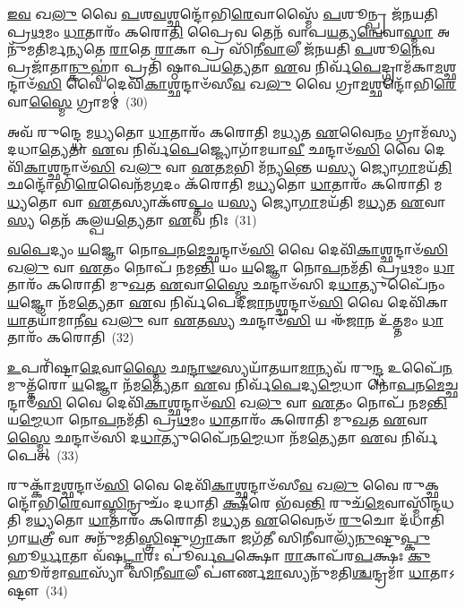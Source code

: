 \-\ul{𑌇}\-\-\ul{𑌵} 𑌖\-\ul{𑌲𑍁} 𑌵𑍈 \ul{𑌪}\-𑌶\-\ul{𑌵}\-𑌶𑍍𑌛𑌨𑍍𑌦𑍋᳴𑌭𑌿\-\ul{𑌰𑍇}\-𑌵𑌾𑌸𑍍𑌮𑍈᳴ \ul{𑌪}\-𑌶𑍂𑌨𑍍𑌪𑍍𑌰 𑌜᳴𑌨𑌯𑌤𑌿 𑌪𑍍𑌰\-\ul{𑌥}\-𑌮𑌂 \ul{𑌧𑌾}\-𑌤𑌾𑌰𑌂᳴ 𑌕𑌰𑍋\-\ul{𑌤𑌿} 𑌪𑍍𑌰𑍈𑌵 𑌤𑍇𑌨᳴ 𑌵𑌾𑌪\-\ul{𑌯}\-𑌤𑍍𑌯\-\ul{𑌨𑍍𑌵𑍇}\-𑌵𑌾\-\ul{𑌸𑍍𑌮𑌾} 𑌅𑌨𑍁᳴𑌮𑌤𑌿𑌰𑍍𑌮𑌨𑍍𑌯𑌤𑍇 \ul{𑌰𑌾}\-𑌤𑍇 \ul{𑌰𑌾}\-𑌕𑌾 𑌪𑍍𑌰 𑌸𑌿᳴𑌨𑍀\-\ul{𑌵𑌾}\-𑌲𑍀 𑌜᳴𑌨𑌯𑌤𑌿 \ul{𑌪}\-𑌶𑍂\-\ul{𑌨𑍇}\-𑌵 𑌪𑍍𑌰𑌜𑌾᳴𑌤𑌾\-\ul{𑌨𑍍𑌕𑍁}\-𑌹𑍍𑌵𑌾॑ 𑌪𑍍𑌰𑌤𑌿᳴ 𑌷𑍍𑌠𑌾𑌪𑌯\-\ul{𑌤𑍍𑌯𑍇}\-𑌤𑌾 \ul{𑌏}\-𑌵 𑌨𑌿𑌰𑍍𑌵᳴\-\ul{𑌪𑍇}\-𑌦𑍍𑌗𑍍𑌰𑌾𑌮᳴𑌕𑌾\-\ul{𑌮}\-𑌶𑍍𑌛𑌨𑍍𑌦𑌾𑍞᳴\-\ul{𑌸𑌿} 𑌵𑍈 𑌦𑍇𑌵𑌿᳴\-\ul{𑌕𑌾}\-𑌶𑍍𑌛𑌨𑍍𑌦𑌾𑍞᳴𑌸𑍀\-\ul{𑌵} 𑌖\-\ul{𑌲𑍁} 𑌵𑍈 𑌗𑍍𑌰𑌾\-\ul{𑌮}\-𑌶𑍍𑌛𑌨𑍍𑌦𑍋᳴𑌭𑌿\-\ul{𑌰𑍇}\-𑌵𑌾\-\ul{𑌸𑍍𑌮𑍈} 𑌗𑍍𑌰𑌾𑌮𑌮𑍍॑~(30)

𑌅𑌵᳴ 𑌰𑍁𑌨𑍍𑌦𑍍𑌧𑍇 𑌮\-\ul{𑌧𑍍𑌯}\-𑌤𑍋 \ul{𑌧𑌾}\-𑌤𑌾𑌰𑌂᳴ 𑌕𑌰𑍋𑌤𑌿 𑌮\-\ul{𑌧𑍍𑌯}\-𑌤 \ul{𑌏}\-𑌵𑍈\-\ul{𑌨𑌂} 𑌗𑍍𑌰𑌾𑌮᳴𑌸𑍍𑌯 𑌦𑌧𑌾\-\ul{𑌤𑍍𑌯𑍇}\-𑌤𑌾 \ul{𑌏}\-𑌵 𑌨𑌿𑌰𑍍𑌵᳴\-\ul{𑌪𑍇}\-𑌜𑍍𑌜𑍍𑌯𑍋𑌗𑌾᳴𑌮𑌯𑌾\-\ul{𑌵𑍀} 𑌛𑌨𑍍𑌦𑌾𑍞᳴\-\ul{𑌸𑌿} 𑌵𑍈 𑌦𑍇𑌵𑌿᳴\-\ul{𑌕𑌾}\-𑌶𑍍𑌛𑌨𑍍𑌦𑌾𑍞᳴\-\ul{𑌸𑌿} 𑌖\-\ul{𑌲𑍁} 𑌵𑌾 \ul{𑌏}\-𑌤\-\ul{𑌮}\-𑌭𑌿 𑌮᳴𑌨𑍍𑌯\-\ul{𑌨𑍍𑌤𑍇} 𑌯\-\ul{𑌸𑍍𑌯} 𑌜𑍍𑌯𑍋\-\ul{𑌗𑌾}\-𑌮𑌯᳴\-\ul{𑌤𑌿} 𑌛𑌨𑍍𑌦𑍋᳴𑌭𑌿\-\ul{𑌰𑍇}\-𑌵𑍈𑌨᳴𑌮\-\ul{𑌗}\-𑌦𑌂 𑌕᳴𑌰𑍋𑌤𑌿 𑌮\-\ul{𑌧𑍍𑌯}\-𑌤𑍋 \ul{𑌧𑌾}\-𑌤𑌾𑌰𑌂᳴ 𑌕𑌰𑍋𑌤𑌿 𑌮\-\ul{𑌧𑍍𑌯}\-𑌤𑍋 𑌵𑌾 \ul{𑌏}\-𑌤𑌸𑍍𑌯𑌾𑌕𑍢᳴\-\ul{𑌪𑍍𑌤𑌂} 𑌯\-\ul{𑌸𑍍𑌯} 𑌜𑍍𑌯𑍋\-\ul{𑌗𑌾}\-𑌮𑌯᳴𑌤𑌿 𑌮\-\ul{𑌧𑍍𑌯}\-𑌤 \ul{𑌏}\-𑌵𑌾\-\ul{𑌸𑍍𑌯} 𑌤𑍇𑌨᳴ 𑌕𑌲𑍍𑌪𑌯\-\ul{𑌤𑍍𑌯𑍇}\-𑌤𑌾 \ul{𑌏}\-𑌵 𑌨𑌿𑌃~(31)

\-\ul{𑌵}\-\-\ul{𑌪𑍇}\-𑌦𑍍𑌯𑌂 \ul{𑌯}\-𑌜𑍍𑌞𑍋 𑌨𑍋\-\ul{𑌪}\-𑌨\-\ul{𑌮𑍇}\-𑌚𑍍𑌛𑌨𑍍𑌦𑌾𑍞᳴\-\ul{𑌸𑌿} 𑌵𑍈 𑌦𑍇𑌵𑌿᳴\-\ul{𑌕𑌾}\-𑌶𑍍𑌛𑌨𑍍𑌦𑌾𑍞᳴\-\ul{𑌸𑌿} 𑌖\-\ul{𑌲𑍁} 𑌵𑌾 \ul{𑌏}\-𑌤𑌂 𑌨𑍋𑌪᳴ 𑌨𑌮\-\ul{𑌨𑍍𑌤𑌿} 𑌯𑌂 \ul{𑌯}\-𑌜𑍍𑌞𑍋 𑌨𑍋\-\ul{𑌪}\-𑌨𑌮᳴𑌤𑌿 𑌪𑍍𑌰\-\ul{𑌥}\-𑌮𑌂 \ul{𑌧𑌾}\-𑌤𑌾𑌰𑌂᳴ 𑌕𑌰𑍋𑌤𑌿 𑌮𑍁\-\ul{𑌖}\-𑌤 \ul{𑌏}\-𑌵𑌾\-\ul{𑌸𑍍𑌮𑍈} 𑌛𑌨𑍍𑌦𑌾𑍞᳴𑌸𑌿 𑌦\-\ul{𑌧𑌾}\-𑌤𑍍𑌯𑍁𑌪𑍈᳴𑌨𑌂 \ul{𑌯}\-𑌜𑍍𑌞𑍋 𑌨᳴𑌮\-\ul{𑌤𑍍𑌯𑍇}\-𑌤𑌾 \ul{𑌏}\-𑌵 𑌨𑌿𑌰𑍍𑌵᳴𑌪𑍇𑌦𑍀\-\ul{𑌜𑌾}\-𑌨𑌶𑍍𑌛𑌨𑍍𑌦𑌾𑍞᳴\-\ul{𑌸𑌿} 𑌵𑍈 𑌦𑍇𑌵𑌿᳴𑌕𑌾 \ul{𑌯𑌾}\-𑌤𑌯𑌾᳴𑌮𑌾𑌨𑍀\-\ul{𑌵} 𑌖\-\ul{𑌲𑍁} 𑌵𑌾 \ul{𑌏}\-𑌤\-\ul{𑌸𑍍𑌯} 𑌛𑌨𑍍𑌦𑌾𑍞᳴\-\ul{𑌸𑌿} 𑌯 𑌈᳴\-\ul{𑌜𑌾}\-𑌨 𑌉᳴\-\ul{𑌤𑍍𑌤}\-𑌮𑌂 \ul{𑌧𑌾}\-𑌤𑌾𑌰𑌂᳴ 𑌕𑌰𑍋𑌤𑌿~(32)

\-\ul{𑌉}\-𑌪𑌰𑌿᳴𑌷𑍍𑌟𑌾\-\ul{𑌦𑍇}\-𑌵𑌾\-\ul{𑌸𑍍𑌮𑍈} 𑌛\-\ul{𑌨𑍍𑌦𑌾}\-\-\ul{𑍟}\-𑌸𑍍𑌯𑌯𑌾᳴𑌤𑌯𑌾\-\ul{𑌮𑌾}\-𑌨𑍍𑌯𑌵᳴ 𑌰𑍁\-\ul{𑌨𑍍𑌦𑍍𑌧} 𑌉𑌪𑍈᳴\-\ul{𑌨}\-𑌮𑍁𑌤𑍍𑌤᳴𑌰𑍋 \ul{𑌯}\-𑌜𑍍𑌞𑍋 𑌨᳴𑌮\-\ul{𑌤𑍍𑌯𑍇}\-𑌤𑌾 \ul{𑌏}\-𑌵 𑌨𑌿𑌰𑍍𑌵᳴\-\ul{𑌪𑍇}\-𑌦𑍍𑌯\-\ul{𑌮𑍍𑌮𑍇}\-𑌧𑌾 𑌨𑍋\-\ul{𑌪}\-𑌨\-\ul{𑌮𑍇}\-𑌚𑍍𑌛𑌨𑍍𑌦𑌾𑍞᳴\-\ul{𑌸𑌿} 𑌵𑍈 𑌦𑍇𑌵𑌿᳴\-\ul{𑌕𑌾}\-𑌶𑍍𑌛𑌨𑍍𑌦𑌾𑍞᳴\-\ul{𑌸𑌿} 𑌖\-\ul{𑌲𑍁} 𑌵𑌾 \ul{𑌏}\-𑌤𑌂 𑌨𑍋𑌪᳴ 𑌨𑌮\-\ul{𑌨𑍍𑌤𑌿} 𑌯\-\ul{𑌮𑍍𑌮𑍇}\-𑌧𑌾 𑌨𑍋\-\ul{𑌪}\-𑌨𑌮᳴𑌤𑌿 𑌪𑍍𑌰\-\ul{𑌥}\-𑌮𑌂 \ul{𑌧𑌾}\-𑌤𑌾𑌰𑌂᳴ 𑌕𑌰𑍋𑌤𑌿 𑌮𑍁\-\ul{𑌖}\-𑌤 \ul{𑌏}\-𑌵𑌾\-\ul{𑌸𑍍𑌮𑍈} 𑌛𑌨𑍍𑌦𑌾𑍞᳴𑌸𑌿 𑌦\-\ul{𑌧𑌾}\-𑌤𑍍𑌯𑍁𑌪𑍈᳴𑌨\-\ul{𑌮𑍍𑌮𑍇}\-𑌧𑌾 𑌨᳴𑌮\-\ul{𑌤𑍍𑌯𑍇}\-𑌤𑌾 \ul{𑌏}\-𑌵 𑌨𑌿𑌰𑍍𑌵᳴𑌪𑍇𑌤𑍍~(33)

𑌰𑍁𑌕𑍍𑌕𑌾᳴\-\ul{𑌮}\-𑌶𑍍𑌛𑌨𑍍𑌦𑌾𑍞᳴\-\ul{𑌸𑌿} 𑌵𑍈 𑌦𑍇𑌵𑌿᳴\-\ul{𑌕𑌾}\-𑌶𑍍𑌛𑌨𑍍𑌦𑌾𑍞᳴𑌸𑍀\-\ul{𑌵} 𑌖\-\ul{𑌲𑍁} 𑌵𑍈 𑌰𑍁𑌕𑍍𑌛𑌨𑍍𑌦𑍋᳴𑌭𑌿\-\ul{𑌰𑍇}\-𑌵𑌾\-\ul{𑌸𑍍𑌮𑌿}\-𑌨𑍍𑌰𑍁𑌚𑌂᳴ 𑌦𑌧𑌾𑌤𑌿 \ul{𑌕𑍍𑌷𑍀}\-𑌰𑍇 𑌭᳴𑌵\-\ul{𑌨𑍍𑌤𑌿} 𑌰𑍁𑌚᳴\-\ul{𑌮𑍇}\-𑌵𑌾𑌸𑍍𑌮𑌿᳴𑌨𑍍𑌦𑌧𑌤𑌿 𑌮\-\ul{𑌧𑍍𑌯}\-𑌤𑍋 \ul{𑌧𑌾}\-𑌤𑌾𑌰𑌂᳴ 𑌕𑌰𑍋𑌤𑌿 𑌮\-\ul{𑌧𑍍𑌯}\-𑌤 \ul{𑌏}\-𑌵𑍈𑌨𑍞᳴ \ul{𑌰𑍁}\-𑌚𑍋 𑌦᳴𑌧𑌾𑌤𑌿 𑌗𑌾\-\ul{𑌯}\-𑌤𑍍𑌰𑍀 𑌵𑌾 𑌅𑌨𑍁᳴𑌮𑌤𑌿\-\ul{𑌸𑍍𑌤𑍍𑌰𑌿}\-𑌷𑍍𑌟𑍁\-\ul{𑌗𑍍𑌰𑌾}\-𑌕𑌾 𑌜𑌗᳴𑌤𑍀 𑌸𑌿𑌨𑍀𑌵𑌾𑌲𑍍𑌯᳴\-\ul{𑌨𑍁}\-𑌷𑍍𑌟𑍁\-\ul{𑌪𑍍𑌕𑍁}\-𑌹𑍂\-\ul{𑌰𑍍𑌧𑌾}\-𑌤𑌾 𑌵᳴𑌷\-\ul{𑌟𑍍𑌕𑌾}\-𑌰𑌃 𑌪𑍂॑𑌰𑍍𑌵\-\ul{𑌪}\-𑌕𑍍𑌷𑍋 \ul{𑌰𑌾}\-𑌕𑌾𑌪᳴𑌰\-\ul{𑌪}\-𑌕𑍍𑌷𑌃 \ul{𑌕𑍁}\-𑌹𑍂𑌰᳴𑌮𑌾\-\ul{𑌵𑌾}\-𑌸𑍍𑌯𑌾᳴ 𑌸𑌿𑌨𑍀\-\ul{𑌵𑌾}\-𑌲𑍀 𑌪𑍗॑𑌰𑍍𑌣\-\ul{𑌮𑌾}\-𑌸𑍍𑌯𑌨𑍁᳴𑌮𑌤𑌿\-\ul{𑌶𑍍𑌚}\-𑌨𑍍𑌦𑍍𑌰𑌮𑌾᳴ \ul{𑌧𑌾}\-𑌤𑌾\-𑌽𑌷𑍍𑌟𑍗~(34)

